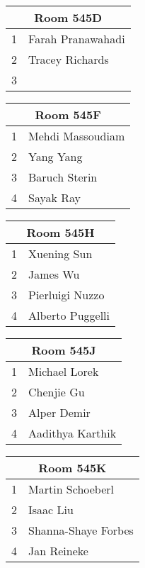 \documentclass{article}
\begin{document}
\Huge
\bfseries

\noindent
\begin{tabular}{|l|l|}
\hline
\multicolumn{2}{|c|}{Room 545D} \\ \hline\hline
1&Farah Pranawahadi\\
2&Tracey Richards\\
3& \\

\hline
\end{tabular}
\vspace{1in}

\noindent
\begin{tabular}{|l|l|}
\hline
\multicolumn{2}{|c|}{Room 545F} \\ \hline\hline
1&Mehdi Massoudiam\\
2&Yang Yang\\
3&Baruch Sterin\\
4&Sayak Ray\\

\hline
\end{tabular}
\vspace{1in}

\noindent
\begin{tabular}{|l|l|}
\hline
\multicolumn{2}{|c|}{Room 545H} \\ \hline\hline
1&Xuening Sun\\
2&James Wu\\
3&Pierluigi Nuzzo\\
4&Alberto Puggelli\\

\hline
\end{tabular}
\vspace{1in}

\noindent
\begin{tabular}{|l|l|}
\hline
\multicolumn{2}{|c|}{Room 545J} \\ \hline\hline
1&Michael Lorek\\
2&Chenjie Gu\\
3&Alper Demir\\
4&Aadithya Karthik\\

\hline
\end{tabular}
\vspace{1in}

\noindent
\begin{tabular}{|l|l|}
\hline
\multicolumn{2}{|c|}{Room 545K} \\ \hline\hline
1&Martin Schoeberl\\
2&Isaac Liu\\
3&Shanna-Shaye Forbes\\
4&Jan Reineke\\

\hline
\end{tabular}
\vspace{1in}
\end{document}
